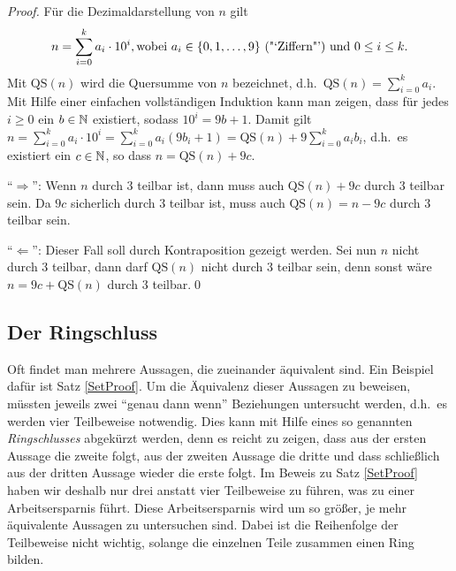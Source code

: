 \begin{proof}
Für die Dezimaldarstellung von $n$ gilt
\begin{displaymath}
n = \sum_{i=0}^k a_i \cdot 10^i, \text{wobei $a_i \in \{0,1, \ldots
,9\}$ ("`Ziffern"') und $0 \le i \le k$}.
\end{displaymath}
Mit $\mathrm{QS}(n)$ wird die Quersumme von $n$ bezeichnet,
d.h.~$\mathrm{QS}(n) = \sum_{i=0}^{k} a_i$. Mit Hilfe einer einfachen vollständigen
Induktion kann man zeigen, dass für jedes $i \ge 0$ ein $b \in \mathbb N$
existiert, sodass $10^i = 9 b + 1$. Damit gilt $n = \sum_{i=0}^k
a_i \cdot 10^i = \sum_{i=0}^k a_i (9 b_i + 1) = \mathrm{QS}(n) +
9 \sum_{i=0}^k a_i b_i$, d.h.~es existiert ein $c \in \mathbb N$, so dass $n
= \mathrm{QS}(n) + 9c$.

\bigskip

\noindent "`$\Rightarrow$"': Wenn $n$ durch $3$ teilbar ist, dann muss auch $\mathrm{QS}(n) + 9c$ durch $3$
teilbar sein. Da $9c$ sicherlich durch $3$ teilbar ist, muss auch
$\mathrm{QS}(n) = n - 9c$ durch $3$ teilbar sein.

\medskip

\noindent "`$\Leftarrow$"': Dieser Fall soll durch Kontraposition gezeigt
werden. Sei nun $n$ nicht durch $3$ teilbar, dann darf
$\mathrm{QS}(n)$ nicht durch $3$ teilbar sein, denn sonst wäre $n = 9c
+ \mathrm{QS}(n)$ durch $3$ teilbar.\qed
\end{proof}

\subsection{Der Ringschluss}
\label{RingSchluss}
Oft findet man mehrere Aussagen, die zueinander äquivalent sind. Ein
Beispiel dafür ist Satz \ref{SetProof}. Um die Äquivalenz dieser
Aussagen zu beweisen, müssten jeweils zwei "`genau dann wenn"'
Beziehungen untersucht werden, d.h.~es werden vier Teilbeweise
notwendig. Dies kann mit Hilfe eines so
genannten \emph{Ringschlusses} 
abgekürzt werden, denn es reicht zu zeigen, dass aus der ersten Aussage die 
zweite folgt, aus der zweiten Aussage die dritte und dass schließlich aus der
dritten Aussage wieder die erste folgt. Im Beweis zu
Satz \ref{SetProof} haben wir deshalb nur drei anstatt vier
Teilbeweise zu führen, was zu einer Arbeitsersparnis führt. Diese
Arbeitsersparnis wird um so größer, je mehr äquivalente Aussagen zu
untersuchen sind. Dabei ist die Reihenfolge der Teilbeweise nicht
wichtig, solange die einzelnen Teile zusammen einen Ring bilden.

